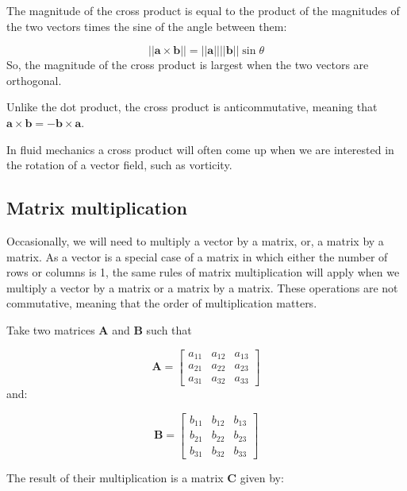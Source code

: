 \documentclass[12pt]{article}
\numberwithin{equation}{section}
\numberwithin{figure}{section}
\numberwithin{table}{section}
\begin{document}
The magnitude of the cross product is equal to the product of the magnitudes of
the two vectors times the sine of the angle between them:

\begin{equation}
  ||\mathbf{a} \times \mathbf{b}|| = ||\mathbf{a}|| ||\mathbf{b}|| \sin{\theta}
  \label{eq:cross_product_magnitude}
\end{equation}
So, the magnitude of the cross product is largest when the two vectors are
orthogonal.

Unlike the dot product, the cross product is anticommutative, meaning that
$\mathbf{a} \times \mathbf{b} = -\mathbf{b} \times \mathbf{a}$.

In fluid mechanics a cross product will often come up when we are interested in
the rotation of a vector field, such as vorticity.

\subsection{Matrix multiplication}

Occasionally, we will need to multiply a vector by a matrix, or, a matrix by a
matrix.
As a vector is a special case of a matrix in which either the number of rows or
columns is 1, the same rules of matrix multiplication will apply when we
multiply a vector by a matrix or a matrix by a matrix.
These operations are not commutative, meaning that the order of multiplication
matters.

Take two matrices $\mathbf{A}$ and $\mathbf{B}$ such that

\begin{equation}
  \mathbf{A} =
  \begin{bmatrix}
    a_{11} & a_{12} & a_{13} \\
    a_{21} & a_{22} & a_{23} \\
    a_{31} & a_{32} & a_{33}
  \end{bmatrix}
\end{equation}
and:

\begin{equation}
  \mathbf{B} =
  \begin{bmatrix}
    b_{11} & b_{12} & b_{13} \\
    b_{21} & b_{22} & b_{23} \\
    b_{31} & b_{32} & b_{33}
  \end{bmatrix}
\end{equation}

The result of their multiplication is a matrix $\mathbf{C}$ given by:
\end{document}
